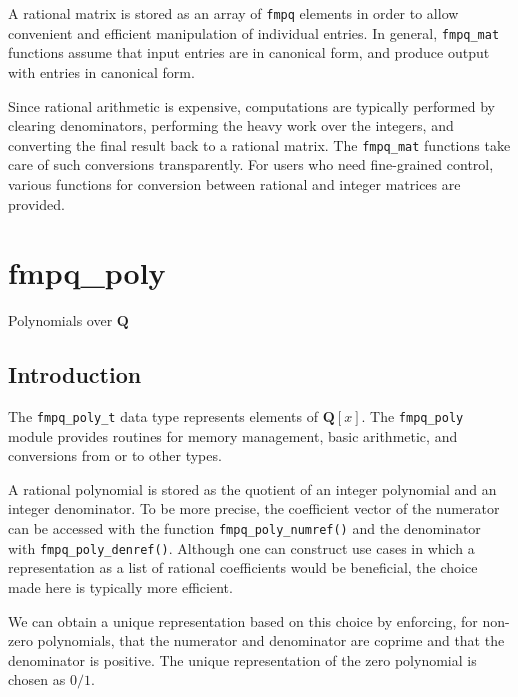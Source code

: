 \documentclass[a4paper,10pt]{book}
\newcommand{\Q}{\mathbf{Q}}%
\newcommand{\code}{\lstinline}
\begin{document}
{{A rational matrix is stored as an array of \code{fmpq} elements in order
to allow convenient and efficient manipulation of individual entries.
In general, \code{fmpq_mat} functions assume that input entries are
in canonical form, and produce output with entries in canonical form.

Since rational arithmetic is expensive, computations are typically performed
by clearing denominators, performing the heavy work over the integers,
and converting the final result back to a rational matrix. The
\code{fmpq_mat} functions take care of such conversions transparently.
For users who need fine-grained control, various
functions for conversion between rational and integer matrices are provided.




\chapter{fmpq\_poly}
\epigraph{Polynomials over $\Q$}{}

\section{Introduction}

The \code{fmpq_poly_t} data type represents elements of $\Q[x]$. The
\code{fmpq_poly} module provides routines for memory management, basic
arithmetic, and conversions from or to other types.

A rational polynomial is stored as the quotient of an integer polynomial
and an integer denominator.  To be more precise, the coefficient vector
of the numerator can be accessed with the function \code{fmpq_poly_numref()}
and the denominator with \code{fmpq_poly_denref()}.  Although one can
construct use cases in which a representation as a list of rational
coefficients would be beneficial, the choice made here is typically
more efficient.

We can obtain a unique representation based on this choice by enforcing,
for non-zero polynomials, that the numerator and denominator are coprime
and that the denominator is positive.  The unique representation of the
zero polynomial is chosen as $0/1$.

}}
\end{document}
